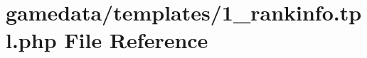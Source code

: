 \hypertarget{1__rankinfo_8tpl_8php}{\section{gamedata/templates/1\+\_\+rankinfo.tpl.\+php File Reference}
\label{1__rankinfo_8tpl_8php}
}
